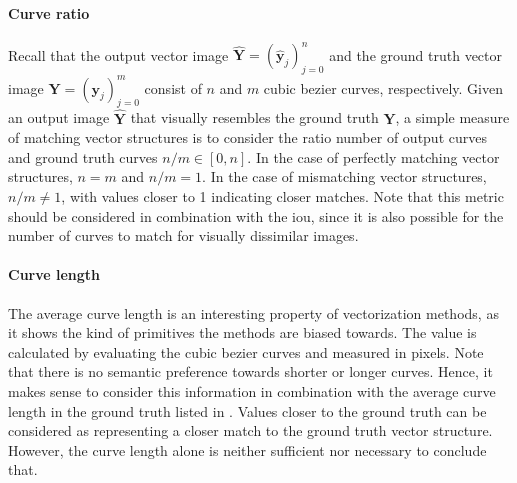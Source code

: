 \paragraph{Curve ratio}
Recall that the output vector image $\hat{\mathbf{Y}}=(\hat{\mathbf{y}}_j)_{j=0}^n$ and the ground truth vector image $\mathbf{Y}=(\mathbf{y}_j)_{j=0}^m$ consist of $n$ and $m$ cubic bezier curves, respectively. Given an output image $\hat{\mathbf{Y}}$ that visually resembles the ground truth $\mathbf{Y}$, a simple measure of matching vector structures is to consider the ratio number of output curves and ground truth curves $n/m\in[0,n]$. In the case of perfectly matching vector structures, $n=m$ and $n/m=1$. In the case of mismatching vector structures, $n/m\neq1$, with values closer to 1 indicating closer matches. Note that this metric should be considered in combination with the \gls{iou}, since it is also possible for the number of curves to match for visually dissimilar images.

\paragraph{Curve length}
The average curve length is an interesting property of vectorization methods, as it shows the kind of primitives the methods are biased towards. The value is calculated by evaluating the cubic bezier curves and measured in pixels. Note that there is no semantic preference towards shorter or longer curves. Hence, it makes sense to consider this information in combination with the average curve length in the ground truth listed in . Values closer to the ground truth can be considered as representing a closer match to the ground truth vector structure. However, the curve length alone is neither sufficient nor necessary to conclude that.

